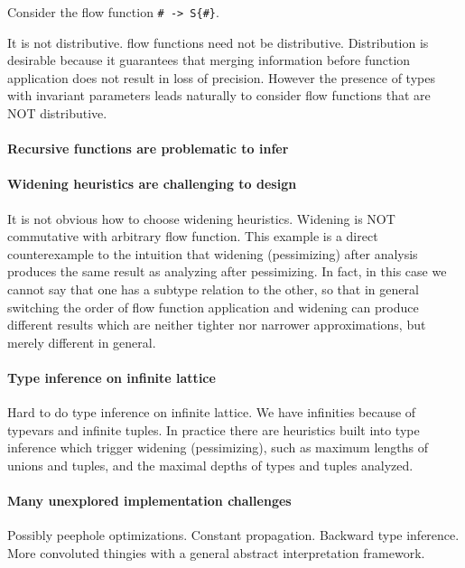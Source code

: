 \documentclass[pldi]{sigplanconf-pldi15}
\begin{document}
Consider the flow function \verb|# -> S{#}|.

It is not distributive.
flow functions need not be distributive. Distribution is desirable because it
guarantees that merging information before function application does not result
in loss of precision. However the presence of types with invariant parameters
leads naturally to consider flow functions that are NOT distributive.

\paragraph{Recursive functions are problematic to infer}

\paragraph{Widening heuristics are challenging to design}
It is not obvious how to choose widening heuristics. Widening is NOT
commutative with arbitrary flow function. This example is a direct
counterexample to the intuition that widening (pessimizing) after analysis
produces the same result as analyzing after pessimizing. In fact, in this case
we cannot say that one has a subtype relation to the other, so that in general
switching the order of flow function application and widening can produce
different results which are neither tighter nor narrower approximations, but
merely different in general.

\paragraph{Type inference on infinite lattice}
Hard to do type inference on infinite lattice. We have infinities because of
typevars and infinite tuples.  In practice there are heuristics built into type
inference which trigger widening (pessimizing), such as maximum lengths of
unions and tuples, and the maximal depths of types and tuples analyzed.
 

\paragraph{Many unexplored implementation challenges}
Possibly peephole optimizations. Constant propagation. Backward type inference.
More convoluted thingies with a general abstract interpretation framework.




\listoftodos %



\end{document}

